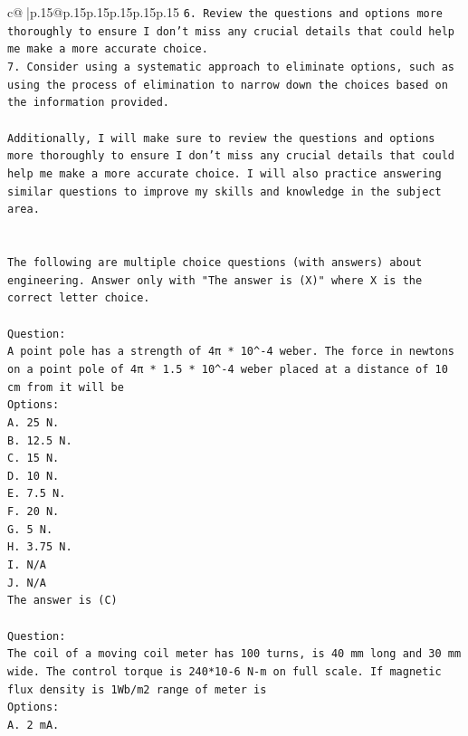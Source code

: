 \documentclass{article}
\begin{document}
{\begin{supertabular}{c@{$\;$}|p{.15\linewidth}@{}p{.15\linewidth}p{.15\linewidth}p{.15\linewidth}p{.15\linewidth}p{.15\linewidth}}
{{{\texttt{6. Review the questions and options more thoroughly to ensure I don't miss any crucial details that could help me make a more accurate choice.} \\
\texttt{7. Consider using a systematic approach to eliminate options, such as using the process of elimination to narrow down the choices based on the information provided.} \\
\\ 
\texttt{Additionally, I will make sure to review the questions and options more thoroughly to ensure I don't miss any crucial details that could help me make a more accurate choice. I will also practice answering similar questions to improve my skills and knowledge in the subject area.} \\
\\ 
\\ 
\texttt{The following are multiple choice questions (with answers) about engineering. Answer only with "The answer is (X)" where X is the correct letter choice.} \\
\\ 
\texttt{Question:} \\
\texttt{A point pole has a strength of 4π * 10\^{}{-}4 weber. The force in newtons on a point pole of 4π * 1.5 * 10\^{}{-}4 weber placed at a distance of 10 cm from it will be} \\
\texttt{Options:} \\
\texttt{A. 25 N.} \\
\texttt{B. 12.5 N.} \\
\texttt{C. 15 N.} \\
\texttt{D. 10 N.} \\
\texttt{E. 7.5 N.} \\
\texttt{F. 20 N.} \\
\texttt{G. 5 N.} \\
\texttt{H. 3.75 N.} \\
\texttt{I. N/A} \\
\texttt{J. N/A} \\
\texttt{The answer is (C)} \\
\\ 
\texttt{Question:} \\
\texttt{The coil of a moving coil meter has 100 turns, is 40 mm long and 30 mm wide. The control torque is 240*10{-}6 N{-}m on full scale. If magnetic flux density is 1Wb/m2 range of meter is} \\
\texttt{Options:} \\
\texttt{A. 2 mA.} \\
}}}
\end{supertabular}}
\end{document}
